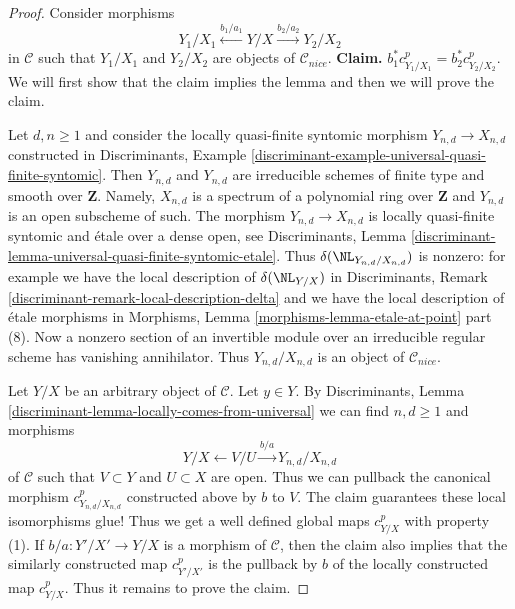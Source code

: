 \begin{proof}
\medskip\noindent
Consider morphisms
$$
Y_1/X_1 \xleftarrow{b_1/a_1} Y/X \xrightarrow{b_2/a_2} Y_2/X_2
$$
in $\mathcal{C}$ such that $Y_1/X_1$ and $Y_2/X_2$ are objects
of $\mathcal{C}_{nice}$.
{\bf Claim.} $b_1^*c^p_{Y_1/X_1} = b_2^*c^p_{Y_2/X_2}$.
We will first show that the claim implies the lemma
and then we will prove the claim.

\medskip\noindent
Let $d, n \geq 1$ and consider the locally
quasi-finite syntomic morphism $Y_{n, d} \to X_{n, d}$
constructed in Discriminants, Example
\ref{discriminant-example-universal-quasi-finite-syntomic}.
Then $Y_{n, d}$ and $Y_{n, d}$ are irreducible schemes of finite type and
smooth over $\mathbf{Z}$. Namely, $X_{n, d}$ is a spectrum of a
polynomial ring over $\mathbf{Z}$ and $Y_{n, d}$ is an open subscheme
of such. The morphism $Y_{n, d} \to X_{n, d}$ is locally quasi-finite syntomic
and \'etale over a dense open, see Discriminants, Lemma
\ref{discriminant-lemma-universal-quasi-finite-syntomic-etale}.
Thus $\delta(\NL_{Y_{n, d}/X_{n, d}})$ is nonzero: for example we have
the local description of $\delta(\NL_{Y/X})$ in
Discriminants, Remark \ref{discriminant-remark-local-description-delta}
and we have the local description of \'etale morphisms in
Morphisms, Lemma \ref{morphisms-lemma-etale-at-point} part (8).
Now a nonzero section of an invertible module over an irreducible
regular scheme has vanishing annihilator. Thus
$Y_{n, d}/X_{n, d}$ is an object of $\mathcal{C}_{nice}$.

\medskip\noindent
Let $Y/X$ be an arbitrary object of $\mathcal{C}$. Let $y \in Y$.
By Discriminants, Lemma \ref{discriminant-lemma-locally-comes-from-universal}
we can find $n, d \geq 1$ and morphisms
$$
Y/X \leftarrow V/U \xrightarrow{b/a} Y_{n, d}/X_{n, d}
$$
of $\mathcal{C}$ such that $V \subset Y$ and $U \subset X$ are open.
Thus we can pullback the canonical morphism $c^p_{Y_{n, d}/X_{n, d}}$
constructed above by $b$ to $V$. The claim guarantees these local
isomorphisms glue! Thus we get a well defined global maps
$c^p_{Y/X}$ with property (1).
If $b/a : Y'/X' \to Y/X$ is a morphism of $\mathcal{C}$, then
the claim also implies that the similarly constructed map
$c^p_{Y'/X'}$ is the pullback by $b$ of the locally constructed
map $c^p_{Y/X}$. Thus it remains to prove the claim.


\end{proof}

